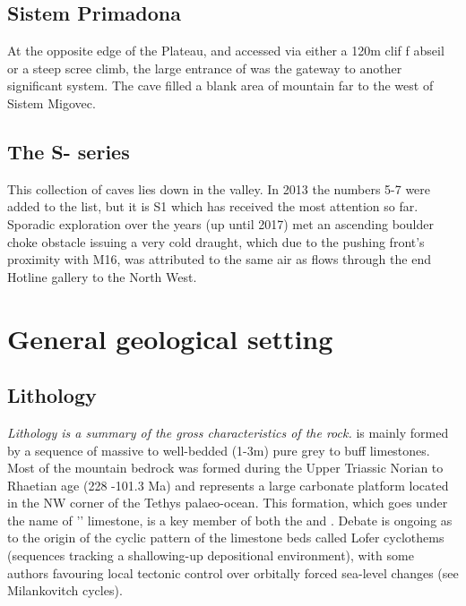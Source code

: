 \subsection{Sistem Primadona} At the opposite edge of the Plateau, and accessed via either a 120m clif f abseil or a steep scree climb, the large entrance of  was the gateway to another significant system. The cave filled a blank area of mountain far to the west of Sistem Migovec.

\subsection{The S- series} This collection of caves lies down in   the  valley. In 2013 the numbers 5-7 were added to the list, but it is S1 which has received the most attention so far. Sporadic exploration over the years (up until 2017) met an ascending boulder choke obstacle issuing a very cold draught, which due to the pushing front's proximity with M16, was attributed to the same air as flows through the end Hotline gallery to the North West. 



\section{General geological setting}

\subsection{Lithology}
\emph{Lithology is a summary of the gross characteristics of the rock.}
 is mainly formed by a sequence of massive to well-bedded (1-3m) pure grey to buff limestones. Most of the mountain bedrock was formed during the Upper Triassic Norian to Rhaetian age (228 -101.3 Ma) and represents a large carbonate platform located in the NW corner of the Tethys palaeo-ocean. This formation, which goes under the name of '' limestone, is a key member of both the  and . Debate is ongoing as to the origin of the cyclic pattern of the limestone beds called Lofer cyclothems (sequences tracking a shallowing-up depositional environment), with some authors favouring local tectonic control over orbitally forced sea-level changes (see Milankovitch cycles).


